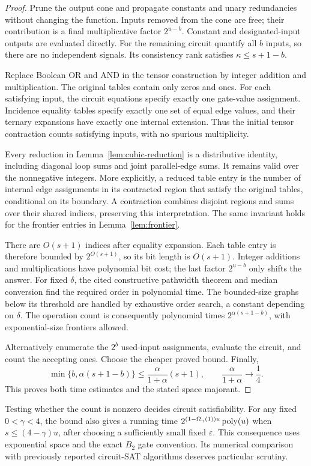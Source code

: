 \begin{proof}
Prune the output cone and propagate constants and unary redundancies
without changing the function. Inputs removed from the cone are free;
their contribution is a final multiplicative factor $2^{u-b}$.
Constant and designated-input outputs are evaluated directly. For the
remaining circuit quantify all $b$ inputs, so there are no independent
signals. Its consistency rank satisfies $\kappa\le s+1-b$.

Replace Boolean OR and AND in the tensor construction by integer
addition and multiplication. The original tables contain only zeros
and ones. For each satisfying input, the circuit equations specify
exactly one gate-value assignment. Incidence equality tables specify
exactly one set of equal edge values, and their ternary expansions have
exactly one internal extension. Thus the initial tensor contraction
counts satisfying inputs, with no spurious multiplicity.

Every reduction in Lemma~\ref{lem:cubic-reduction} is a distributive
identity, including diagonal loop sums and joint parallel-edge sums.
It remains valid over the nonnegative integers. More explicitly, a
reduced table entry is the number of internal edge assignments in its
contracted region that satisfy the original tables, conditional on its
boundary. A contraction combines disjoint regions and sums over their
shared indices, preserving this interpretation. The same invariant
holds for the frontier entries in Lemma~\ref{lem:frontier}.

There are $O(s+1)$ indices after equality expansion. Each table entry
is therefore bounded by $2^{O(s+1)}$, so its bit length is $O(s+1)$.
Integer additions and multiplications have polynomial bit cost; the
last factor $2^{u-b}$ only shifts the answer. For fixed $\delta$, the
cited constructive pathwidth theorem and median conversion find the
required order in polynomial time. The bounded-size graphs below its
threshold are handled by exhaustive order search, a constant depending
on $\delta$. The operation count is consequently polynomial times
$2^{\alpha(s+1-b)}$, with exponential-size frontiers allowed.

Alternatively enumerate the $2^b$ used-input assignments, evaluate the
circuit, and count the accepting ones. Choose the cheaper proved bound.
Finally,
\[
 \min\{b,\alpha(s+1-b)\}
 \le\frac{\alpha}{1+\alpha}(s+1),
 \qquad \frac{\alpha}{1+\alpha}\longrightarrow\frac14.
\]
This proves both time estimates and the stated space majorant.
\end{proof}

Testing whether the count is nonzero decides circuit satisfiability.
For any fixed $0<\gamma<4$, the bound also gives a running time
$2^{(1-\Omega_\gamma(1))u}\operatorname{poly}(u)$ when
$s\le(4-\gamma)u$, after choosing a sufficiently small fixed
$\varepsilon$. This consequence uses exponential space and the exact
$B_2$ gate convention. Its numerical comparison with previously
reported circuit-SAT algorithms deserves particular scrutiny.
